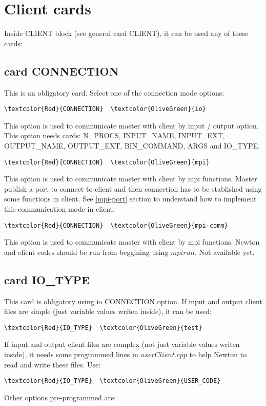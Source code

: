 \section{Client cards}

Inside CLIENT block (see general card CLIENT), it can be used any of these cards:

\subsection{card CONNECTION}
This is an obligatory card. Select one of the connection mode options: 
\begin{Verbatim}[frame=single,commandchars=\\\{\}]
\textcolor{Red}{CONNECTION}  \textcolor{OliveGreen}{io}
\end{Verbatim}
This option is used to communicate master with client by input / output option. This option needs cards: N_PROCS, INPUT_NAME, INPUT_EXT, OUTPUT_NAME, OUTPUT_EXT, BIN_COMMAND, ARGS and IO_TYPE.

\begin{Verbatim}[frame=single,commandchars=\\\{\}]
\textcolor{Red}{CONNECTION}  \textcolor{OliveGreen}{mpi}
\end{Verbatim}
This option is used to communicate master with client by mpi functions. Master publish a port to connect to client and then connection has to be stablished using some functions in client. See \ref{mpi-port} section to understand how to implement this communication mode in client.

\begin{Verbatim}[frame=single,commandchars=\\\{\}]
\textcolor{Red}{CONNECTION}  \textcolor{OliveGreen}{mpi-comm}
\end{Verbatim}
This option is used to communicate master with client by mpi functions. Newton and client codes should be run from beggining using $mpirun$. Not available yet.

\subsection{card IO_TYPE}
This card is obligatory using io CONNECTION option.
If input and output client files are simple (just variable values writen inside), it can be used:
\begin{Verbatim}[frame=single,commandchars=\\\{\}]
\textcolor{Red}{IO_TYPE}  \textcolor{OliveGreen}{test}
\end{Verbatim}
If input and output client files are complex (not just variable values writen inside), it needs some programmed lines in $userClient.cpp$ to help Newton to read and write these files. Use:
\begin{Verbatim}[frame=single,commandchars=\\\{\}]
\textcolor{Red}{IO_TYPE}  \textcolor{OliveGreen}{USER_CODE}
\end{Verbatim}
Other options pre-programmed are:

